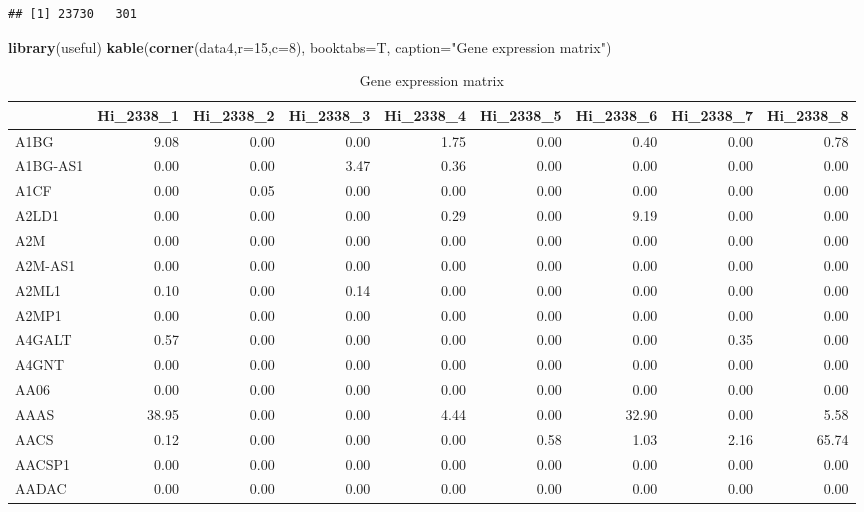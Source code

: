 \documentclass[]{article}
\newenvironment{Shaded}{\begin{snugshade}}{\end{snugshade}}
\newcommand{\KeywordTok}[1]{\textcolor[rgb]{0.13,0.29,0.53}{\textbf{{#1}}}}
\newcommand{\DataTypeTok}[1]{\textcolor[rgb]{0.13,0.29,0.53}{{#1}}}
\newcommand{\DecValTok}[1]{\textcolor[rgb]{0.00,0.00,0.81}{{#1}}}
\newcommand{\StringTok}[1]{\textcolor[rgb]{0.31,0.60,0.02}{{#1}}}
\newcommand{\NormalTok}[1]{{#1}}
\numberwithin{figure}{section}
\numberwithin{table}{section}
\theoremstyle{definition}
\theoremstyle{definition}
\theoremstyle{definition}
\theoremstyle{remark}
\begin{document}
\begin{verbatim}
## [1] 23730   301
\end{verbatim}

\begin{Shaded}
\begin{Highlighting}[]
\KeywordTok{library}\NormalTok{(useful)}
\KeywordTok{kable}\NormalTok{(}\KeywordTok{corner}\NormalTok{(data4,}\DataTypeTok{r=}\DecValTok{15}\NormalTok{,}\DataTypeTok{c=}\DecValTok{8}\NormalTok{), }\DataTypeTok{booktabs=}\NormalTok{T, }\DataTypeTok{caption=}\StringTok{"Gene expression matrix"}\NormalTok{)}
\end{Highlighting}
\end{Shaded}

\begin{table}

\caption{\label{tab:nbthiseqdata}Gene expression matrix}
\centering
\begin{tabular}[t]{lrrrrrrrr}
\toprule
  & Hi\_2338\_1 & Hi\_2338\_2 & Hi\_2338\_3 & Hi\_2338\_4 & Hi\_2338\_5 & Hi\_2338\_6 & Hi\_2338\_7 & Hi\_2338\_8\\
\midrule
A1BG & 9.08 & 0.00 & 0.00 & 1.75 & 0.00 & 0.40 & 0.00 & 0.78\\
A1BG-AS1 & 0.00 & 0.00 & 3.47 & 0.36 & 0.00 & 0.00 & 0.00 & 0.00\\
A1CF & 0.00 & 0.05 & 0.00 & 0.00 & 0.00 & 0.00 & 0.00 & 0.00\\
A2LD1 & 0.00 & 0.00 & 0.00 & 0.29 & 0.00 & 9.19 & 0.00 & 0.00\\
A2M & 0.00 & 0.00 & 0.00 & 0.00 & 0.00 & 0.00 & 0.00 & 0.00\\
\addlinespace
A2M-AS1 & 0.00 & 0.00 & 0.00 & 0.00 & 0.00 & 0.00 & 0.00 & 0.00\\
A2ML1 & 0.10 & 0.00 & 0.14 & 0.00 & 0.00 & 0.00 & 0.00 & 0.00\\
A2MP1 & 0.00 & 0.00 & 0.00 & 0.00 & 0.00 & 0.00 & 0.00 & 0.00\\
A4GALT & 0.57 & 0.00 & 0.00 & 0.00 & 0.00 & 0.00 & 0.35 & 0.00\\
A4GNT & 0.00 & 0.00 & 0.00 & 0.00 & 0.00 & 0.00 & 0.00 & 0.00\\
\addlinespace
AA06 & 0.00 & 0.00 & 0.00 & 0.00 & 0.00 & 0.00 & 0.00 & 0.00\\
AAAS & 38.95 & 0.00 & 0.00 & 4.44 & 0.00 & 32.90 & 0.00 & 5.58\\
AACS & 0.12 & 0.00 & 0.00 & 0.00 & 0.58 & 1.03 & 2.16 & 65.74\\
AACSP1 & 0.00 & 0.00 & 0.00 & 0.00 & 0.00 & 0.00 & 0.00 & 0.00\\
AADAC & 0.00 & 0.00 & 0.00 & 0.00 & 0.00 & 0.00 & 0.00 & 0.00\\
\bottomrule
\end{tabular}
\end{table}
\end{document}
